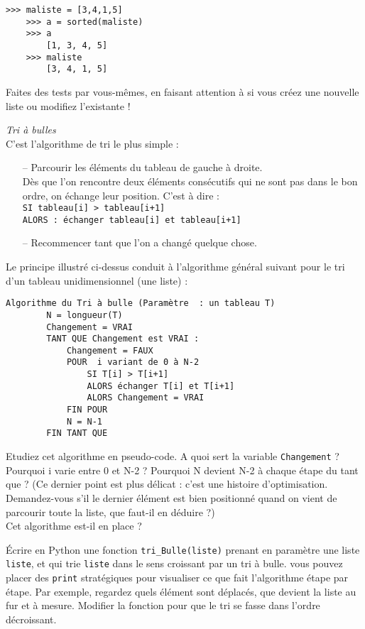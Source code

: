 \begin{Verbatim}[tabsize=4]
	>>> maliste = [3,4,1,5]
	>>> a = sorted(maliste)
	>>> a
		[1, 3, 4, 5]
	>>> maliste
		[3, 4, 1, 5]
\end{Verbatim}

\ques Faites des tests par vous-mêmes, en faisant attention à si vous créez une nouvelle liste ou modifiez l'existante !

\newpage
\exo
\textit{Tri à bulles}\\
C'est l'algorithme de tri le plus simple :
\begin{enumerate}
	\item [--] Parcourir les éléments du tableau de gauche à droite. \\

	      Dès que l'on rencontre deux éléments consécutifs qui ne sont pas dans le bon ordre, on échange leur position.
	      C'est à dire :\\
	      \texttt{SI tableau[i] > tableau[i+1]}\\
	      \texttt{ALORS : échanger tableau[i] et tableau[i+1]}

	\item[--] Recommencer tant que l'on a changé quelque chose.
\end{enumerate}

Le principe illustré ci-dessus conduit à l'algorithme général suivant pour le tri d'un tableau unidimensionnel (une liste) :
\begin{Verbatim}[tabsize=4]
	Algorithme du Tri à bulle (Paramètre  : un tableau T)
        N = longueur(T)
        Changement = VRAI
        TANT QUE Changement est VRAI :
            Changement = FAUX
            POUR  i variant de 0 à N-2
                SI T[i] > T[i+1]
                ALORS échanger T[i] et T[i+1]
                ALORS Changement = VRAI
            FIN POUR
            N = N-1
        FIN TANT QUE
\end{Verbatim}

\ques Etudiez cet algorithme en pseudo-code. A quoi sert la variable \texttt{Changement} ? Pourquoi i varie entre 0 et N-2 ? Pourquoi N devient N-2 à chaque étape du tant que ? (Ce dernier point est plus délicat : c'est une histoire d'optimisation. Demandez-vous s'il le dernier élément est bien positionné quand on vient de parcourir toute la liste, que faut-il en déduire ?) \\
Cet algorithme est-il en place ?

\quessques Écrire en Python une fonction \texttt{tri\_Bulle(liste)} prenant en paramètre une liste \texttt{liste}, et qui trie \texttt{liste} dans le sens croissant par un tri à bulle.
 vous pouvez placer des \texttt{print} stratégiques pour visualiser ce que fait l'algorithme étape par étape. Par exemple, regardez quels élément sont déplacés, que devient la liste au fur et à mesure.
\ssques Modifier la fonction pour que le tri se fasse dans l'ordre décroissant.

